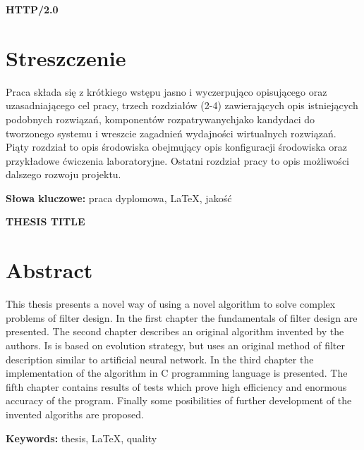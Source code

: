 \newpage
\begin{center}
\large \bf
HTTP/2.0
\end{center}

\section*{Streszczenie}
Praca składa się z krótkiego wstępu jasno i
wyczerpująco opisującego oraz uzasadniającego cel pracy, trzech rozdziałów (2-4)
zawierających opis istniejących podobnych
rozwiązań, komponentów rozpatrywanychjako kandydaci do
tworzonego systemu i wreszcie zagadnień wydajności wirtualnych
rozwiązań. Piąty rozdział to opis  środowiska obejmujący opis konfiguracji
środowiska oraz przykładowe ćwiczenia laboratoryjne. Ostatni
rozdział pracy to opis możliwości dalszego
rozwoju projektu. 

\bigskip
{\noindent\bf Słowa kluczowe:} praca dyplomowa, LaTeX, jakość

\vskip 2cm


\begin{center}
\large \bf
THESIS TITLE
\end{center}

\section*{Abstract}
This thesis presents a novel way of using a novel algorithm to solve complex
problems of filter design. In the first chapter the fundamentals of filter design
are presented. The second chapter describes an original algorithm invented by the
authors. Is is based on evolution strategy, but uses an original method of filter
description similar to artificial neural network. In the third chapter the implementation
of the algorithm in C programming language is presented. The fifth chapter contains results
of tests which prove high efficiency and enormous accuracy of the program. Finally some
posibilities of further development of the invented algoriths are proposed.

\bigskip
{\noindent\bf Keywords:} thesis, LaTeX, quality

\vfill